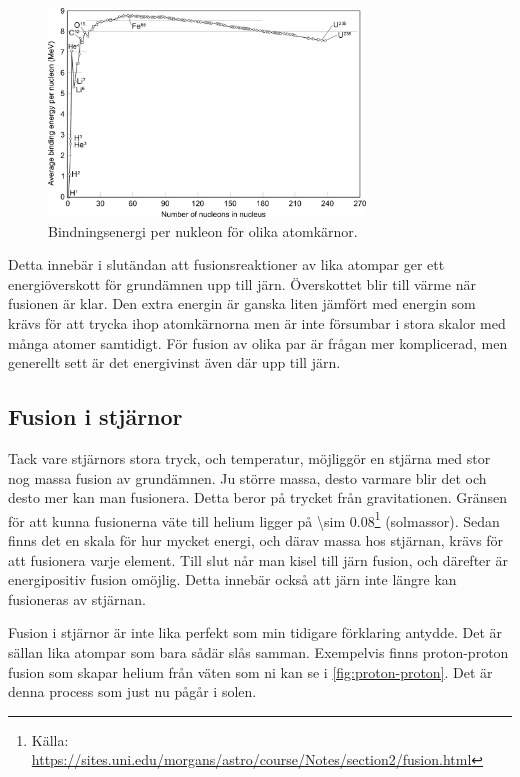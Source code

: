 \begin{figure}
    \centering
    \includegraphics[width=0.75\textwidth]{img/Binding_energy_curve_-_common_isotopes.png}
    \caption{Bindningsenergi per nukleon för olika atomkärnor.}
    \label{fig:binding-energy}
\end{figure}

Detta innebär i slutändan att fusionsreaktioner av lika atompar ger ett energiöverskott för grundämnen upp till järn. Överskottet blir till värme när fusionen är klar. Den extra energin är ganska liten jämfört med energin som krävs för att trycka ihop atomkärnorna men är inte försumbar i stora skalor med många atomer samtidigt. För fusion av olika par är frågan mer komplicerad, men generellt sett är det energivinst även där upp till järn.

\subsection{Fusion i stjärnor}
Tack vare stjärnors stora tryck, och temperatur, möjliggör en stjärna med stor nog massa fusion av grundämnen. Ju större massa, desto varmare blir det och desto mer kan man fusionera. Detta beror på trycket från gravitationen. Gränsen för att kunna fusionerna väte till helium ligger på \qty{\sim 0.08}{\Mo}\footnote{Källa: \textcolor{blue}{\url{https://sites.uni.edu/morgans/astro/course/Notes/section2/fusion.html}}} (solmassor). Sedan finns det en skala för hur mycket energi, och därav massa hos stjärnan, krävs för att fusionera varje element. Till slut når man kisel till järn fusion, och därefter är energipositiv fusion omöjlig. Detta innebär också att järn inte längre kan fusioneras av stjärnan.

Fusion i stjärnor är inte lika perfekt som min tidigare förklaring antydde. Det är sällan lika atompar som bara sådär slås samman. Exempelvis finns proton-proton fusion som skapar helium från väten som ni kan se i \cref{fig:proton-proton}. Det är denna process som just nu pågår i solen.

